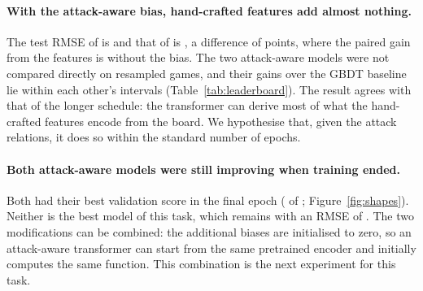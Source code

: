 \documentclass[11pt]{article}
\begin{document}
\paragraph{With the attack-aware bias, hand-crafted features add almost
nothing.}
The test RMSE of  is
 and that of
 is
, a difference of
 points, where the paired
gain from the features is
 without the bias.
The two attack-aware models were not compared directly on resampled games,
and their gains over the GBDT baseline lie within each other's intervals
(Table~\ref{tab:leaderboard}). The result agrees with that of the longer schedule: the
transformer can derive most of what the hand-crafted features encode from the
board. We hypothesise that, given the attack relations, it does so within
the standard number of epochs.

\paragraph{Both attack-aware models were still improving when training
ended.}
Both had their best validation score in the final epoch
( of
; Figure~\ref{fig:shapes}). Neither
is the best model of this task, which remains  with an RMSE of
. The two modifications can be combined: the additional biases
are initialised to zero, so an attack-aware transformer can start from the
same pretrained encoder and initially computes the same function. This
combination is the next experiment for this task.
\fi
\end{document}

